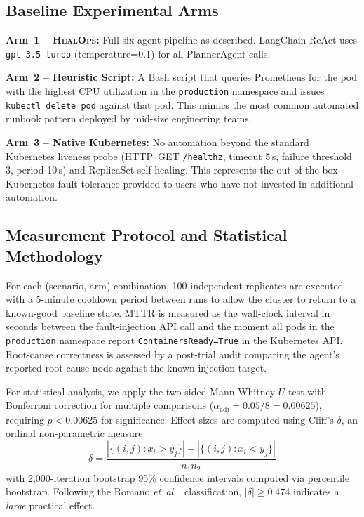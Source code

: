 \documentclass[journal,10pt,twoside]{IEEEtran}
\newcommand{\HealOps}{\textsc{HealOps}}
\newcommand{\etal}{\textit{et~al.}}
\begin{document}
\subsection{Baseline Experimental Arms}

\textbf{Arm~1 -- \HealOps{}:}
Full six-agent pipeline as described. LangChain ReAct uses
\texttt{gpt-3.5-turbo} (temperature=0.1) for all PlannerAgent calls.

\textbf{Arm~2 -- Heuristic Script:}
A Bash script that queries Prometheus for the pod with the highest CPU
utilization in the \texttt{production} namespace and issues
\texttt{kubectl delete pod} against that pod. This mimics the most
common automated runbook pattern deployed by mid-size engineering teams.

\textbf{Arm~3 -- Native Kubernetes:}
No automation beyond the standard Kubernetes liveness probe
(HTTP~GET \texttt{/healthz}, timeout 5\,s, failure threshold 3,
period 10\,s) and ReplicaSet self-healing. This represents the
out-of-the-box Kubernetes fault tolerance provided to users who have
not invested in additional automation.

\subsection{Measurement Protocol and Statistical Methodology}

For each (scenario, arm) combination, 100 independent replicates are
executed with a 5-minute cooldown period between runs to allow the
cluster to return to a known-good baseline state. MTTR is measured as
the wall-clock interval in seconds between the fault-injection API call
and the moment all pods in the \texttt{production} namespace report
\texttt{ContainersReady=True} in the Kubernetes API. Root-cause
correctness is assessed by a post-trial audit comparing the agent's
reported root-cause node against the known injection target.

For statistical analysis, we apply the two-sided Mann-Whitney $U$ test
with Bonferroni correction for multiple comparisons
($\alpha_{\mathrm{adj}} = 0.05 / 8 = 0.00625$), requiring $p < 0.00625$
for significance. Effect sizes are computed using Cliff's $\delta$,
an ordinal non-parametric measure:
\begin{equation}
  \delta = \frac{|\{(i,j): x_i > y_j\}| - |\{(i,j): x_i < y_j\}|}{n_1 n_2}
\end{equation}
with 2{,}000-iteration bootstrap 95\% confidence intervals computed
via percentile bootstrap. Following the Romano \etal~\cite{romano2006exploring}
classification, $|\delta| \geq 0.474$ indicates a \emph{large} practical
effect.
\end{document}
